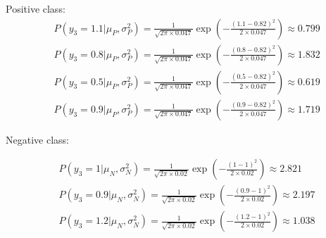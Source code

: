 \documentclass[12pt]{article}
\begin{document}
\begin{enumerate}[leftmargin=\labelsep]
    \vspace{10pt}
    Positive class:
    \begin{equation*}
        \begin{aligned}
            &P(y_3 = 1.1|\mu_P, \sigma_P^2) = \frac{1}{\sqrt{2\pi \times 0.047}} \exp\left(-\frac{(1.1 - 0.82)^2}{2 \times 0.047}\right) \approx 0.799\\
            &P(y_3 = 0.8|\mu_P, \sigma_P^2) = \frac{1}{\sqrt{2\pi \times 0.047}} \exp\left(-\frac{(0.8 - 0.82)^2}{2 \times 0.047}\right) \approx 1.832\\
            &P(y_3 = 0.5|\mu_P, \sigma_P^2) = \frac{1}{\sqrt{2\pi \times 0.047}} \exp\left(-\frac{(0.5 - 0.82)^2}{2 \times 0.047}\right) \approx 0.619\\
            &P(y_3 = 0.9|\mu_P, \sigma_P^2) = \frac{1}{\sqrt{2\pi \times 0.047}} \exp\left(-\frac{(0.9 - 0.82)^2}{2 \times 0.047}\right) \approx 1.719
        \end{aligned}
    \end{equation*}


    \vspace{10pt}
    Negative class:
    
    \begin{equation*}
        \begin{aligned}
            &P(y_3 = 1|\mu_N, \sigma_N^2) = \frac{1}{\sqrt{2\pi \times 0.02}} \exp\left(-\frac{(1 - 1)^2}{2 \times 0.02}\right) \approx 2.821 \\
            &P(y_3 = 0.9|\mu_N, \sigma_N^2) = \frac{1}{\sqrt{2\pi \times 0.02}} \exp\left(-\frac{(0.9 - 1)^2}{2 \times 0.02}\right) \approx 2.197 \\
            &P(y_3 = 1.2|\mu_N, \sigma_N^2) = \frac{1}{\sqrt{2\pi \times 0.02}} \exp\left(-\frac{(1.2 - 1)^2}{2 \times 0.02}\right) \approx 1.038\\
        \end{aligned}
    \end{equation*}


\end{enumerate}
\end{document}
